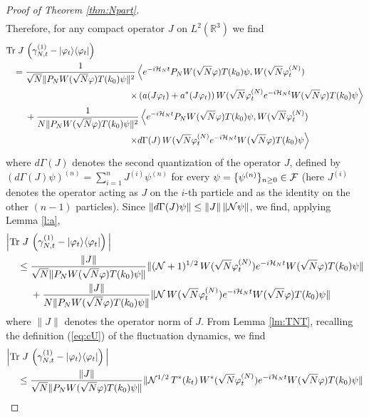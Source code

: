 \documentclass[11pt,a4paper]{article}
\newcommand{\bR}{{\mathbb R}}
\newcommand{\tr}{\mbox{Tr}}
\newcommand{\cF}{{\cal F}}
\newcommand{\cH}{{\cal H}}
\newcommand{\cN}{{\cal N}}
\begin{document}
\begin{proof}[Proof of Theorem \ref{thm:Npart}]
\[\begin{split}
\end{split} \]
Therefore, for any compact operator $J$ on $L^2 (\bR^3)$ we find 
\[ \begin{split} 
\tr \; J \, &\left( \gamma^{(1)}_{N,t} - |\varphi_t \rangle\langle \varphi_t| \right) \\ = \; &\frac{1}{\sqrt{N} \| P_N W(\sqrt{N} \varphi) T(k_0) \psi \|^2}  \left\langle  
e^{-i\cH_N t}  P_N W(\sqrt{N} \varphi) T(k_0) \psi , W (\sqrt{N} \varphi_t^{(N)}) \right. \\ & \left. \hspace{4cm} \times \left( a (J\varphi_t) + a^* (J \varphi_t) \right) W(\sqrt{N} \varphi_t^{(N)}  e^{-i\cH_N t}  W(\sqrt{N} \varphi) T(k_0) \psi \right\rangle
\\ &+  \frac{1}{N \| P_N W(\sqrt{N} \varphi) T(k_0) \psi \|^2} \left\langle  
e^{-i\cH_N t}  P_N W(\sqrt{N} \varphi) T(k_0) \psi , W (\sqrt{N} \varphi_t^{(N)}) \right. \\ &\hspace{4cm} \left.  \times d\Gamma (J) \, W(\sqrt{N} \varphi_t^{(N)}  e^{-i\cH_N t}  W(\sqrt{N} \varphi) T(k_0) \psi \right\rangle \end{split} \]
where $d\Gamma (J)$ denotes the second quantization of the operator $J$, defined by  
\( (d\Gamma (J) \psi)^{(n)} = \sum_{i=1}^n J^{(i)} \psi^{(n)} \)
for every $\psi = \{ \psi^{(n)} \}_{n\geq 0} \in \cF$ (here $J^{(i)}$ denotes the operator acting as $J$ on the $i$-th particle and as the identity on the other $(n-1)$ particles). Since $\| d\Gamma (J)  \psi \| \leq \| J \| \, \| \cN \psi \|$, we find, applying Lemma \ref{l:a}, 
\[ \begin{split}
\Big| \tr \; J \, &\left( \gamma^{(1)}_{N,t} - |\varphi_t \rangle\langle \varphi_t| \right)  \Big| \\ \leq \; &\frac{\| J \|}{\sqrt{N} \| P_N W(\sqrt{N} \varphi) T(k_0) \psi \|}   \| (\cN+1)^{1/2} \, W(\sqrt{N} \varphi_t^{(N)})  e^{-i\cH_N t}  W(\sqrt{N} \varphi) T(k_0) \psi \| 
\\ &+  \frac{\| J \|}{N \| P_N W(\sqrt{N} \varphi) T(k_0) \psi \|} \| \cN \, W(\sqrt{N} \varphi_t^{(N)})  e^{-i\cH_N t}  W(\sqrt{N} \varphi) T(k_0) \psi \|  \end{split} \]
where $\| J \|$ denotes the operator norm of $J$. {F}rom Lemma \ref{lm:TNT}, recalling the definition 
(\ref{eq:cU}) of the fluctuation dynamics, we find
\[  \begin{split}
\Big| \tr \; J \, &\left( \gamma^{(1)}_{N,t} - |\varphi_t \rangle\langle \varphi_t| \right)  \Big| \\  \leq \; &\frac{\| J \|}{\sqrt{N} \| P_N W(\sqrt{N} \varphi) T(k_0) \psi \|}  \| \cN^{1/2} \,T^* (k_t) \,  W^* (\sqrt{N} \varphi_t^{(N)})  e^{-i\cH_N t}  W(\sqrt{N} \varphi) T(k_0) \psi \|  

\end{split}\]
\end{proof}
\end{document}
